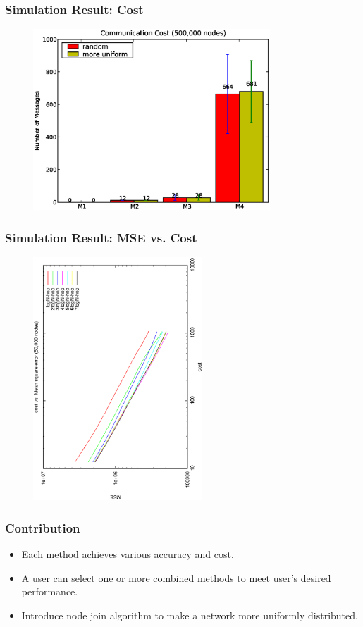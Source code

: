 \documentclass[red]{beamer}
\begin{document}
\begin{frame}
\frametitle{Simulation Result: Cost}
\begin{figure}
\centering
\includegraphics[width=3.5in]{figs/cost500k}
\end{figure}
\end{frame}
\begin{frame}
\frametitle{Simulation Result: MSE vs. Cost}
\begin{figure}
\centering
\includegraphics[width=2.5in,angle=270]{figs/cost_mse1}
\end{figure}
\end{frame}
\begin{frame}
\frametitle{Contribution}
\begin{itemize}
\item Each method achieves various accuracy and cost.
\item A user can select one or more combined methods to meet user's desired performance.
\item Introduce node join algorithm to make a network more uniformly distributed.
\end{itemize}
\end{frame}
\end{document}
